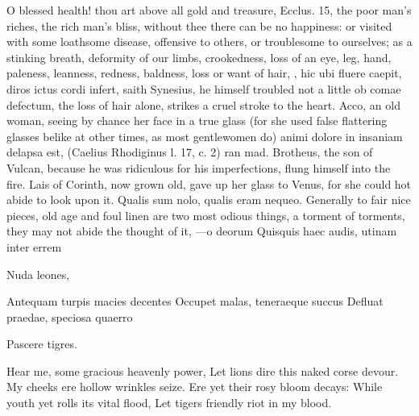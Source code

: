 {O blessed health! thou art above all gold and treasure, Ecclus. 
15, the poor man's riches, the rich man's bliss, without thee there can
be no happiness: or visited with some loathsome disease, offensive to
others, or troublesome to ourselves; as a stinking breath, deformity of
our limbs, crookedness, loss of an eye, leg, hand, paleness, leanness,
redness, baldness, loss or want of hair, \etc{}, hic ubi fluere caepit,
diros ictus cordi infert, saith Synesius, he himself troubled not
a little ob comae defectum, the loss of hair alone, strikes a cruel
stroke to the heart. Acco, an old woman, seeing by chance her face in a
true glass (for she used false flattering glasses belike at other
times, as most gentlewomen do) animi dolore in insaniam delapsa est,
(Caelius Rhodiginus l. 17, c. 2) ran mad. Brotheus, the son of
Vulcan, because he was ridiculous for his imperfections, flung himself
into the fire. Lais of Corinth, now grown old, gave up her glass to
Venus, for she could hot abide to look upon it. Qualis sum nolo,
qualis eram nequeo. Generally to fair nice pieces, old age and foul
linen are two most odious things, a torment of torments, they may not
abide the thought of it,
---o deorum
Quisquis haec audis, utinam inter errem

Nuda leones,

Antequam turpis macies decentes
Occupet malas, teneraeque succus
Defluat praedae, speciosa quaerro

Pascere tigres.


Hear me, some gracious heavenly power,
Let lions dire this naked corse devour.
My cheeks ere hollow wrinkles seize.
Ere yet their rosy bloom decays:
While youth yet rolls its vital flood,
Let tigers friendly riot in my blood.

}
